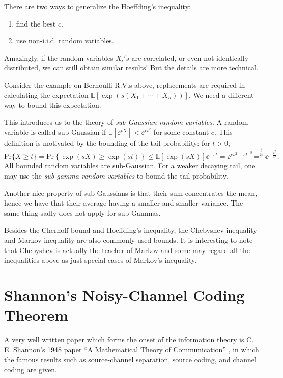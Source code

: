 \begin{remark}
    There are two ways to generalize the Hoeffding's inequality:
    \begin{enumerate}
        \item find the best $c$.
        \item use non-i.i.d. random variables.
    \end{enumerate}
    
    Amazingly, if the random variables ${X_i}'s$ are correlated, or even not identically distributed, we can still obtain similar results! But the details are more technical.

    Consider the example on Bernoulli R.V.s above, replacements are required in calculating the expectation $\mathbb{E}\left[\exp(s(X_1+\cdots+X_n))\right]$. We need a different way to bound this expectation.

    This introduces us to the theory of \textit{sub-Gaussian random variables}. A random variable is called sub-Gaussian if $\mathbb{E}[\ee^{tX}] < \ee^{ct^2}$ for some constant $c$. This definition is motivated by the bounding of the tail probability: for $t>0$,
    \begin{equation}
        \mathrm{Pr}\{X\ge t\} = \mathrm{Pr}\left\{\exp(sX)\ge\exp(st)\right\}  \le \mathbb{E}[\exp(sX)] \ee^{-st} = \ee^{cs^2-st} \stackrel{s=\frac{t}{2c}}{=} \ee^{-\frac{t^2}{4c}}.
    \end{equation}
    All bounded random variables are sub-Gaussian. For a weaker decaying tail, one may use the \textit{sub-gamma random variables} to bound the tail probability.

    Another nice property of sub-Gaussians is that their sum concentrates the mean, hence we have that their average having a smaller and smaller variance. The same thing sadly does not apply for sub-Gammas.
\end{remark}

Besides the Chernoff bound and Hoeffding's inequality, the Chebyshev inequality and Markov inequality are also commonly used bounds. It is interesting to note that Chebyshev is actually the teacher of Markov and some may regard all the inequalities above as just special cases of Markov's inequality.




\section{Shannon's Noisy-Channel Coding Theorem}
A very well written paper which forms the onset of the information theory is C. E. Shannon's 1948 paper ``A Mathematical Theory of Communication'' \cite{Shannon}, in which the famous results such as source-channel separation, source coding, and channel coding are given.

